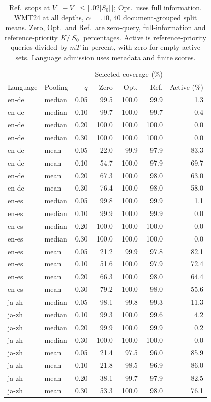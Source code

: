 \begin{table}[t]
\centering\small
\begin{tabular}{llrrrrr}
\toprule
 &  &  & \multicolumn{3}{c}{Selected coverage (\%)} & \\
Language & Pooling & $q$ & Zero & Opt. & Ref. & Active (\%) \\
\midrule
en-de & median & 0.05 & 99.5 & 100.0 & 99.9 & 1.3 \\
en-de & median & 0.10 & 99.7 & 100.0 & 99.7 & 0.4 \\
en-de & median & 0.20 & 100.0 & 100.0 & 100.0 & 0.0 \\
en-de & median & 0.30 & 100.0 & 100.0 & 100.0 & 0.0 \\
en-de & mean & 0.05 & 22.0 & 99.9 & 97.9 & 83.3 \\
en-de & mean & 0.10 & 54.7 & 100.0 & 97.9 & 69.7 \\
en-de & mean & 0.20 & 67.3 & 100.0 & 98.0 & 63.0 \\
en-de & mean & 0.30 & 76.4 & 100.0 & 98.0 & 58.0 \\
en-es & median & 0.05 & 99.8 & 100.0 & 99.9 & 1.1 \\
en-es & median & 0.10 & 99.9 & 100.0 & 99.9 & 0.0 \\
en-es & median & 0.20 & 100.0 & 100.0 & 100.0 & 0.0 \\
en-es & median & 0.30 & 100.0 & 100.0 & 100.0 & 0.0 \\
en-es & mean & 0.05 & 21.2 & 99.9 & 97.8 & 82.1 \\
en-es & mean & 0.10 & 51.6 & 100.0 & 97.9 & 72.4 \\
en-es & mean & 0.20 & 66.3 & 100.0 & 98.0 & 64.4 \\
en-es & mean & 0.30 & 79.2 & 100.0 & 98.0 & 55.6 \\
ja-zh & median & 0.05 & 98.1 & 99.8 & 99.3 & 11.3 \\
ja-zh & median & 0.10 & 99.3 & 100.0 & 99.6 & 4.2 \\
ja-zh & median & 0.20 & 99.9 & 100.0 & 99.9 & 0.2 \\
ja-zh & median & 0.30 & 100.0 & 100.0 & 100.0 & 0.0 \\
ja-zh & mean & 0.05 & 21.4 & 97.5 & 96.0 & 85.9 \\
ja-zh & mean & 0.10 & 21.8 & 98.5 & 96.9 & 86.0 \\
ja-zh & mean & 0.20 & 38.1 & 99.7 & 97.9 & 82.5 \\
ja-zh & mean & 0.30 & 53.3 & 100.0 & 98.0 & 76.1 \\
\bottomrule
\end{tabular}
\caption{Ref.\ stops at $V^+-V^-\le\lceil .02|S_0|\rceil$; Opt.\ uses full information. WMT24 at all depths, $\alpha=.10$, 40 document-grouped split means. Zero, Opt.\ and Ref.\ are zero-query, full-information and reference-priority $K/|S_0|$ percentages. Active is reference-priority queries divided by $mT$ in percent, with zero for empty active sets. Language admission uses metadata and finite scores.}
\label{tab:review-external-all}
\end{table}
